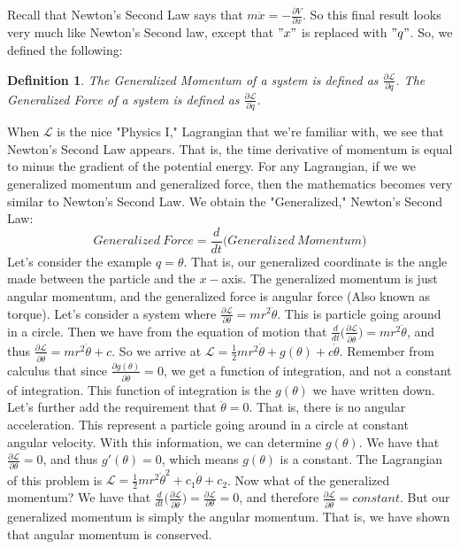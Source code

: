 \documentclass[oneside]{book}
\theoremstyle{mystyle}
\newtheorem{definition}{Definition}[section]
\begin{document}
Recall that Newton's Second Law says that $m\ddot{x} = -\frac{\partial V}{\partial x}$. So this final result looks very much like Newton's Second law, except that $"x"$ is replaced with $"q"$. So, we defined the following:
\begin{definition}
The Generalized Momentum of a system is defined as $\frac{\partial \mathcal{L}}{\partial \dot{q}}$. The Generalized Force of a system is defined as $\frac{\partial \mathcal{L}}{\partial q}$.
\end{definition}
When $\mathcal{L}$ is the nice "Physics I," Lagrangian that we're familiar with, we see that Newton's Second Law appears. That is, the time derivative of momentum is equal to minus the gradient of the potential energy. For any Lagrangian, if we we generalized momentum and generalized force, then the mathematics becomes very similar to Newton's Second Law. We obtain the "Generalized," Newton's Second Law:
\begin{equation}
\nonumber Generalized\ Force = \frac{d}{dt}\big(Generalized\ Momentum\big)
\end{equation}
Let's consider the example $q = \theta$. That is, our generalized coordinate is the angle made between the particle and the $x-$axis. The generalized momentum is just angular momentum, and the generalized force is angular force (Also known as torque). Let's consider a system where $\frac{\partial \mathcal{L}}{\partial \theta} = mr^2 \ddot{\theta}$. This is particle going around in a circle. Then we have from the equation of motion that $\frac{d}{dt}\big(\frac{\partial \mathcal{L}}{\partial \dot{\theta}}\big) = mr^2 \ddot{\theta}$, and thus $\frac{\partial \mathcal{L}}{\partial \dot{\theta}} = mr^2\dot{\theta} +c$. So we arrive at $\mathcal{L} = \frac{1}{2}mr^2\dot{\theta} + g(\theta) + c\dot{\theta}$. Remember from calculus that since $\frac{\partial g(\theta)}{\partial \dot{\theta}} = 0$, we get a function of integration, and not a constant of integration. This function of integration is the $g(\theta)$ we have written down. Let's further add the requirement that $\ddot{\theta} = 0$. That is, there is no angular acceleration. This represent a particle going around in a circle at constant angular velocity. With this information, we can determine $g(\theta)$. We have that $\frac{\partial \mathcal{L}}{\partial \theta} = 0$, and thus $g'(\theta) = 0$, which means $g(\theta)$ is a constant. The Lagrangian of this problem is $\mathcal{L} = \frac{1}{2}mr^2 \dot{\theta}^2+ c_1 \dot{\theta}+c_2$. Now what of the generalized momentum? We have that $\frac{d}{dt}\big(\frac{\partial \mathcal{L}}{\partial \dot{\theta}}\big) = \frac{\partial \mathcal{L}}{\partial \theta} = 0$, and therefore $\frac{\partial \mathcal{L}}{\partial \dot{\theta}} = constant$. But our generalized momentum is simply the angular momentum. That is, we have shown that angular momentum is conserved.
\end{document}
